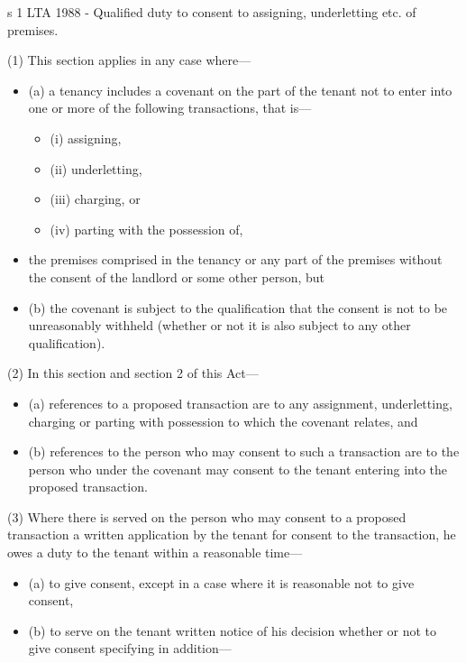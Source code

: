 \documentclass[
]{article}
\providecommand{\tightlist}{%
  \setlength{\itemsep}{0pt}\setlength{\parskip}{0pt}}
\newenvironment{env-2aad614f-6fd6-4025-876c-fcdbeae766fb}
{
    \savenotes\tcolorbox[blanker,breakable,left=5pt,borderline west={2pt}{-4pt}{green}]
}
{
    \endtcolorbox\spewnotes
}
\begin{document}
\begin{env-2aad614f-6fd6-4025-876c-fcdbeae766fb}

s 1 LTA 1988 - Qualified duty to consent to assigning, underletting etc.
of premises.

(1) This section applies in any case where---

\begin{itemize}
\tightlist
\item
  (a) a tenancy includes a covenant on the part of the tenant not to
  enter into one or more of the following transactions, that is---

  \begin{itemize}
  \tightlist
  \item
    (i) assigning,
  \item
    (ii) underletting,
  \item
    (iii) charging, or
  \item
    (iv) parting with the possession of,
  \end{itemize}
\item
  the premises comprised in the tenancy or any part of the premises
  without the consent of the landlord or some other person, but
\item
  (b) the covenant is subject to the qualification that the consent is
  not to be unreasonably withheld (whether or not it is also subject to
  any other qualification).
\end{itemize}

(2) In this section and section 2 of this Act---

\begin{itemize}
\tightlist
\item
  (a) references to a proposed transaction are to any assignment,
  underletting, charging or parting with possession to which the
  covenant relates, and
\item
  (b) references to the person who may consent to such a transaction are
  to the person who under the covenant may consent to the tenant
  entering into the proposed transaction.
\end{itemize}

(3) Where there is served on the person who may consent to a proposed
transaction a written application by the tenant for consent to the
transaction, he owes a duty to the tenant within a reasonable time---

\begin{itemize}
\tightlist
\item
  (a) to give consent, except in a case where it is reasonable not to
  give consent,
\item
  (b) to serve on the tenant written notice of his decision whether or
  not to give consent specifying in addition---


\end{itemize}
\end{env-2aad614f-6fd6-4025-876c-fcdbeae766fb}
\end{document}
